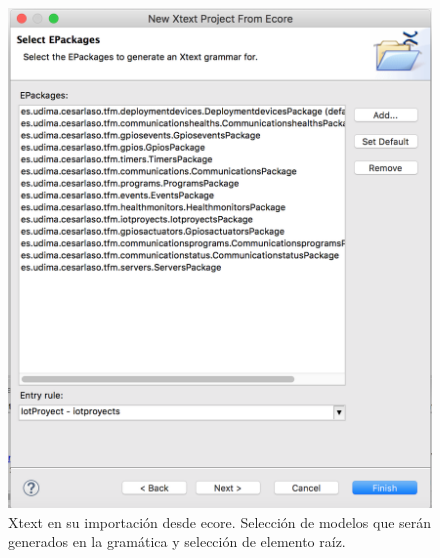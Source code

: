 \begin{figure}
	\centering
    \includegraphics[scale=0.4]{images/emf_capturas/xtext-desde-ecore-paso2}
    \caption{Xtext en su importación desde \gls{ecore}. Selección de modelos que serán generados en la gramática y selección de elemento raíz.}
    \label{fig:xtext_desde_ecore2}
\end{figure}

